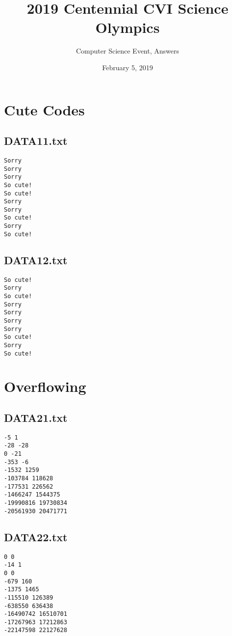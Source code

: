 \documentclass{article}
\title{2019 Centennial CVI Science Olympics}
\author{Computer Science Event, Answers}
\date{February 5, 2019}
\begin{document}
\maketitle


\pagebreak


\LARGE

\section{Cute Codes}

\subsection{DATA11.txt}

\begin{verbatim}
Sorry
Sorry
Sorry
So cute!
So cute!
Sorry
Sorry
So cute!
Sorry
So cute!
\end{verbatim}

\subsection{DATA12.txt}

\begin{verbatim}
So cute!
Sorry
So cute!
Sorry
Sorry
Sorry
Sorry
So cute!
Sorry
So cute!
\end{verbatim}


\pagebreak


\section{Overflowing}

\subsection{DATA21.txt}

\begin{verbatim}
-5 1
-28 -28
0 -21
-353 -6
-1532 1259
-103784 118628
-177531 226562
-1466247 1544375
-19990816 19730834
-20561930 20471771
\end{verbatim}

\subsection{DATA22.txt}

\begin{verbatim}
0 0
-14 1
0 0
-679 160
-1375 1465
-115510 126389
-638550 636438
-16490742 16510701
-17267963 17212863
-22147598 22127628
\end{verbatim}
\end{document}
